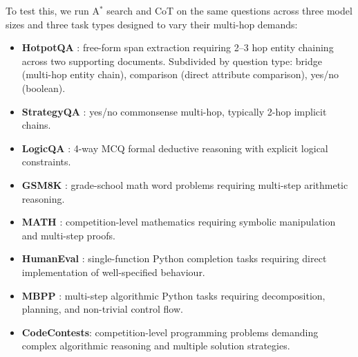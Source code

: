 \documentclass{article}
\newcommand{\astar}{A$^*$\xspace}
\begin{document}
To test this, we run \astar search and CoT on the same questions across three model sizes and three task types designed to vary their multi-hop demands:
\begin{itemize}[leftmargin=*, noitemsep]
  \item \textbf{HotpotQA} \citep{yang2018hotpotqa}: free-form span extraction requiring 2--3 hop entity chaining across two supporting documents. Subdivided by question type: bridge (multi-hop entity chain), comparison (direct attribute comparison), yes/no (boolean).
  \item \textbf{StrategyQA} \citep{geva2021did}: yes/no commonsense multi-hop, typically 2-hop implicit chains.
  \item \textbf{LogicQA} \citep{liu2020logiqa}: 4-way MCQ formal deductive reasoning with explicit logical constraints.
  \item \textbf{GSM8K} \citep{cobbe2021trainingverifierssolvemath}: grade-school math word problems requiring multi-step arithmetic reasoning.
  \item \textbf{MATH} \citep{hendrycks2021measuringmathematicalproblemsolving}: competition-level mathematics requiring symbolic manipulation and multi-step proofs.
  \item \textbf{HumanEval} \citep{chen2021evaluatinglargelanguagemodels}: single-function Python completion tasks requiring direct implementation of well-specified behaviour.
  \item \textbf{MBPP} \citep{austin2021programsynthesislargelanguage}: multi-step algorithmic Python tasks requiring decomposition, planning, and non-trivial control flow.
  \item \textbf{CodeContests}: competition-level programming problems demanding complex algorithmic reasoning and multiple solution strategies.
\end{itemize}
\end{document}
